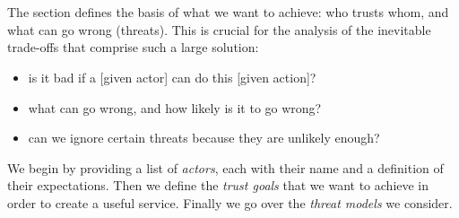 \section{\rot}

The \rot section defines the basis of what we want to achieve: who trusts whom, and what can go wrong (threats).
This is crucial for the analysis of the inevitable trade-offs that comprise such a large solution:

\begin{itemize}
    \item is it bad if a [given actor] can do this [given action]?
    \item what can go wrong, and how likely is it to go wrong?
    \item can we ignore certain threats because they are unlikely enough?
\end{itemize}

We begin by providing a list of \emph{actors}, each with their name and a definition of their expectations.
Then we define the \emph{trust goals} that we want to achieve in order to create a useful service.
Finally we go over the \emph{threat models} we consider.




